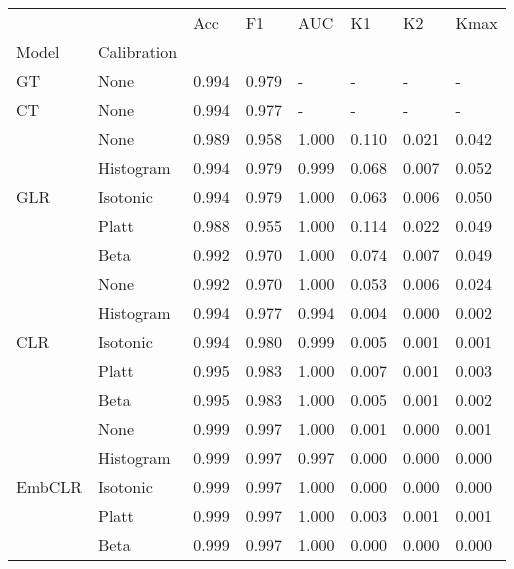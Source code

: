 \begin{tabular}{llllllll}
\toprule
 &  & Acc & F1 & AUC & K1 & K2 & Kmax \\
Model & Calibration &  &  &  &  &  &  \\
\midrule
GT & None & 0.994 & 0.979 & - & - & - & - \\
\cline{1-8}
CT & None & 0.994 & 0.977 & - & - & - & - \\
\cline{1-8}
\multirow[t]{5}{*}{GLR} & None & 0.989 & 0.958 & 1.000 & 0.110 & 0.021 & 0.042 \\
 & Histogram & 0.994 & 0.979 & 0.999 & 0.068 & 0.007 & 0.052 \\
 & Isotonic & 0.994 & 0.979 & 1.000 & 0.063 & 0.006 & 0.050 \\
 & Platt & 0.988 & 0.955 & 1.000 & 0.114 & 0.022 & 0.049 \\
 & Beta & 0.992 & 0.970 & 1.000 & 0.074 & 0.007 & 0.049 \\
\cline{1-8}
\multirow[t]{5}{*}{CLR} & None & 0.992 & 0.970 & 1.000 & 0.053 & 0.006 & 0.024 \\
 & Histogram & 0.994 & 0.977 & 0.994 & 0.004 & 0.000 & 0.002 \\
 & Isotonic & 0.994 & 0.980 & 0.999 & 0.005 & 0.001 & 0.001 \\
 & Platt & 0.995 & 0.983 & 1.000 & 0.007 & 0.001 & 0.003 \\
 & Beta & 0.995 & 0.983 & 1.000 & 0.005 & 0.001 & 0.002 \\
\cline{1-8}
\multirow[t]{5}{*}{EmbCLR} & None & 0.999 & 0.997 & 1.000 & 0.001 & 0.000 & 0.001 \\
 & Histogram & 0.999 & 0.997 & 0.997 & 0.000 & 0.000 & 0.000 \\
 & Isotonic & 0.999 & 0.997 & 1.000 & 0.000 & 0.000 & 0.000 \\
 & Platt & 0.999 & 0.997 & 1.000 & 0.003 & 0.001 & 0.001 \\
 & Beta & 0.999 & 0.997 & 1.000 & 0.000 & 0.000 & 0.000 \\
\cline{1-8}
\bottomrule
\end{tabular}
